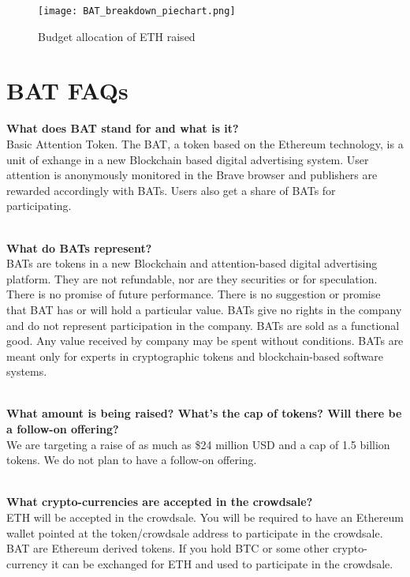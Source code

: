 \documentclass[11pt]{article}
\begin{document}
\begin{figure}
\begin{center}
\texttt{[image: BAT\_breakdown\_piechart.png]}
\caption{Budget allocation of ETH raised}
\end{center}
\end{figure}

\pagebreak

\section{\textrm{BAT} FAQs}
\label{sec-7}
\vspace{0.2in}

\vbox{\textbf{\hspace{0.25in}What does \textrm{BAT} stand for and what is it? }\\
Basic Attention Token. The \textrm{BAT}, a token based on the Ethereum technology, is a unit of exhange in a new Blockchain based digital advertising system. User attention is anonymously monitored in the Brave browser and publishers are rewarded accordingly with \textrm{BAT}s. Users also get a share of \textrm{BAT}s for participating. \\
\\
}

\vbox{\textbf{What do \textrm{BAT}s represent?}\\
\textrm{BAT}s are tokens in a new Blockchain and attention-based digital advertising platform. They are not refundable, nor are they securities or for speculation. There is no promise of future performance. There is no suggestion or promise that \textrm{BAT} has or will hold a particular value. \textrm{BAT}s give no rights in the company and do not represent participation in the company. \textrm{BAT}s are sold as a functional good. Any value received by company may be spent without conditions. \textrm{BAT}s are meant only for experts in cryptographic tokens and blockchain-based software systems.\\
\\
}

\vbox{\textbf{What amount is being raised? What’s the cap of tokens? Will there be a follow-on offering?}\\
We are targeting a raise of as much as \$24 million USD and a cap of 1.5 billion tokens. We do not plan to have a follow-on offering. \\
\\
}

\vbox{\textbf{What crypto-currencies are accepted in the crowdsale?}\\
ETH will be accepted in the crowdsale. You will be required to have an Ethereum wallet pointed at the token/crowdsale address to participate in the crowdsale. \textrm{BAT} are Ethereum derived tokens. If you hold BTC or some other crypto-currency it can be exchanged for ETH and used to participate in the crowdsale.\\
\\
}
\end{document}
